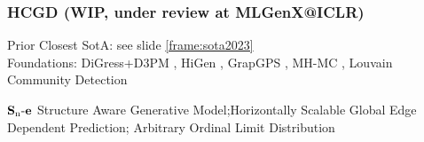 \documentclass[./presentation.tex]{subfiles}
\begin{document}
\begin{frame}[t,label=hcgdfin]
  \frametitle{HCGD (WIP, under review at MLGenX@ICLR)}
  \vspace{-1cm}
  \begin{priorart}
    Prior Closest SotA: see slide \ref{frame:sota2023}\\%
    Foundations: DiGress+D3PM \citep{krawczukGGGANGeometricGraph2020,austinStructuredDenoisingDiffusion2021e}, HiGen \citep{karamiHiGenHierarchicalGraph2023a}, GrapGPS \citep{rampasekRecipeGeneralPowerful2022b}, MH-MC \citep{metropolisEquationStateCalculations1953a}, Louvain Community Detection \citep{newmanFindingEvaluatingCommunity2004,blondelFastUnfoldingCommunities2008d}
  \end{priorart}
  \begin{contributions}
    $\operatorname{\mathbf{S}_n\mathbf{-e}}$ Structure Aware Generative Model;Horizontally Scalable Global Edge Dependent Prediction; Arbitrary Ordinal Limit Distribution
  \end{contributions}
\end{frame}
\end{document}
